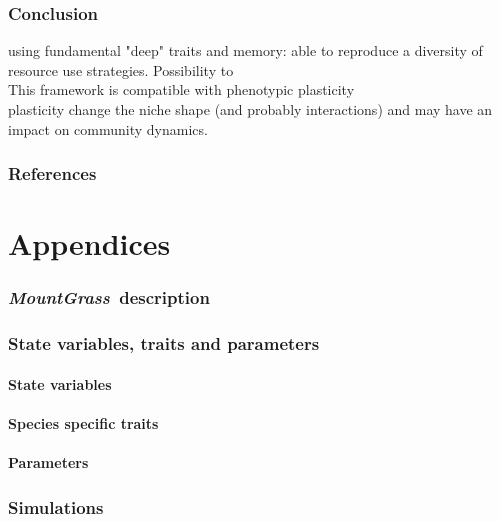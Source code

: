 \documentclass[review]{elsarticle}
\newcommand{\model}{\textbf{\textit{MountGrass}}~}
\begin{document}
\section{Conclusion}
using fundamental "deep" traits and memory: able to reproduce a diversity of resource use strategies. Possibility to \\
This framework is compatible with phenotypic plasticity\\
plasticity change the niche shape (and probably interactions) and may have an impact on community dynamics.


\section*{References}


\part*{Appendices}


\section{\model description}

\section{State variables, traits and parameters}
\subsection{State variables}
\subsection{Species specific traits}
\subsection{Parameters}

\section{Simulations}
\end{document}
